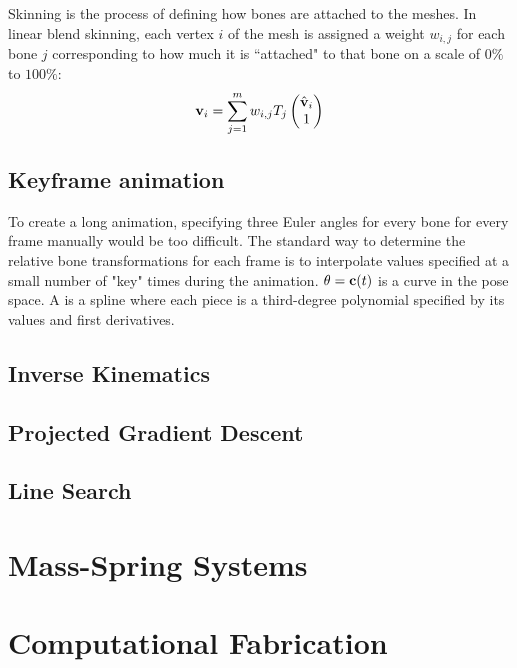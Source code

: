 \documentclass[11pt]{article}
\numberwithin{equation}{section}
\begin{document}
Skinning is the process of defining how bones are attached to the meshes. In linear blend skinning, each vertex $i$ of the mesh is assigned a weight $w_{i,j}$ for each bone $j$ corresponding to how much it is ``attached" to that bone on a scale of $0\%$ to $100\%$:
\begin{equation}
	\textbf{v}_i = \sum_{j=1}^m w_{i,j}T_j\begin{pmatrix}
		\hat{\textbf{v}}_i \\ 1
	\end{pmatrix}
\end{equation}


\subsection{Keyframe animation}
To create a long animation, specifying three Euler angles for every bone for every frame manually would be too difficult. The standard way to determine the relative bone transformations for each frame is to interpolate values specified at a small number of "key" times during the animation. 
 $\theta = \textbf{c}(t)$ is a curve in the pose space. A  is a spline where each piece is a third-degree polynomial specified by its values and first derivatives.
 \subsection{Inverse Kinematics}
 \subsection{Projected Gradient Descent}
 \subsection{Line Search}

\section{Mass-Spring Systems}



\section{Computational Fabrication}
\end{document}
